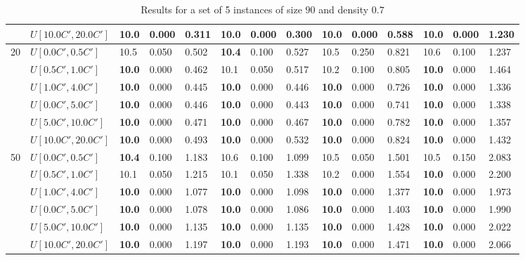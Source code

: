 \begin{table}[h]
{\begin{tabular}{|l|l||l|l|l||l|l|l||l|l|l||l|l|l|}
       & $U[10.0C',20.0C']$ & \textbf{10.0} & 0.000 & 0.311 & \textbf{10.0} & 0.000 & 0.300 & \textbf{10.0} & 0.000 & 0.588 & \textbf{10.0} & 0.000 & 1.230 \\
      \hline\hline
      \multirow{6}{*}{20} & $U[0.0C',0.5C']$ & 10.5 & 0.050 & 0.502 & \textbf{10.4} & 0.100 & 0.527 & 10.5 & 0.250 & 0.821 & 10.6 & 0.100 & 1.237 \\
       & $U[0.5C',1.0C']$ & \textbf{10.0} & 0.000 & 0.462 & 10.1 & 0.050 & 0.517 & 10.2 & 0.100 & 0.805 & \textbf{10.0} & 0.000 & 1.464 \\
       & $U[1.0C',4.0C']$ & \textbf{10.0} & 0.000 & 0.445 & \textbf{10.0} & 0.000 & 0.446 & \textbf{10.0} & 0.000 & 0.726 & \textbf{10.0} & 0.000 & 1.336 \\
       & $U[0.0C',5.0C']$ & \textbf{10.0} & 0.000 & 0.446 & \textbf{10.0} & 0.000 & 0.443 & \textbf{10.0} & 0.000 & 0.741 & \textbf{10.0} & 0.000 & 1.338 \\
       & $U[5.0C',10.0C']$ & \textbf{10.0} & 0.000 & 0.471 & \textbf{10.0} & 0.000 & 0.467 & \textbf{10.0} & 0.000 & 0.782 & \textbf{10.0} & 0.000 & 1.357 \\
       & $U[10.0C',20.0C']$ & \textbf{10.0} & 0.000 & 0.493 & \textbf{10.0} & 0.000 & 0.532 & \textbf{10.0} & 0.000 & 0.824 & \textbf{10.0} & 0.000 & 1.432 \\
      \hline\hline
      \multirow{6}{*}{50} & $U[0.0C',0.5C']$ & \textbf{10.4} & 0.100 & 1.183 & 10.6 & 0.100 & 1.099 & 10.5 & 0.050 & 1.501 & 10.5 & 0.150 & 2.083 \\
       & $U[0.5C',1.0C']$ & 10.1 & 0.050 & 1.215 & 10.1 & 0.050 & 1.338 & 10.2 & 0.000 & 1.554 & \textbf{10.0} & 0.000 & 2.200 \\
       & $U[1.0C',4.0C']$ & \textbf{10.0} & 0.000 & 1.077 & \textbf{10.0} & 0.000 & 1.098 & \textbf{10.0} & 0.000 & 1.377 & \textbf{10.0} & 0.000 & 1.973 \\
       & $U[0.0C',5.0C']$ & \textbf{10.0} & 0.000 & 1.078 & \textbf{10.0} & 0.000 & 1.086 & \textbf{10.0} & 0.000 & 1.403 & \textbf{10.0} & 0.000 & 1.990 \\
       & $U[5.0C',10.0C']$ & \textbf{10.0} & 0.000 & 1.135 & \textbf{10.0} & 0.000 & 1.135 & \textbf{10.0} & 0.000 & 1.428 & \textbf{10.0} & 0.000 & 2.022 \\
       & $U[10.0C',20.0C']$ & \textbf{10.0} & 0.000 & 1.197 & \textbf{10.0} & 0.000 & 1.193 & \textbf{10.0} & 0.000 & 1.471 & \textbf{10.0} & 0.000 & 2.066 \\
      \hline
      \end{tabular}
      }
      \caption{Results for a set of 5 instances of size $90$ and density $0.7$}
      \label{tab:pcpn90p7}\end{table}


